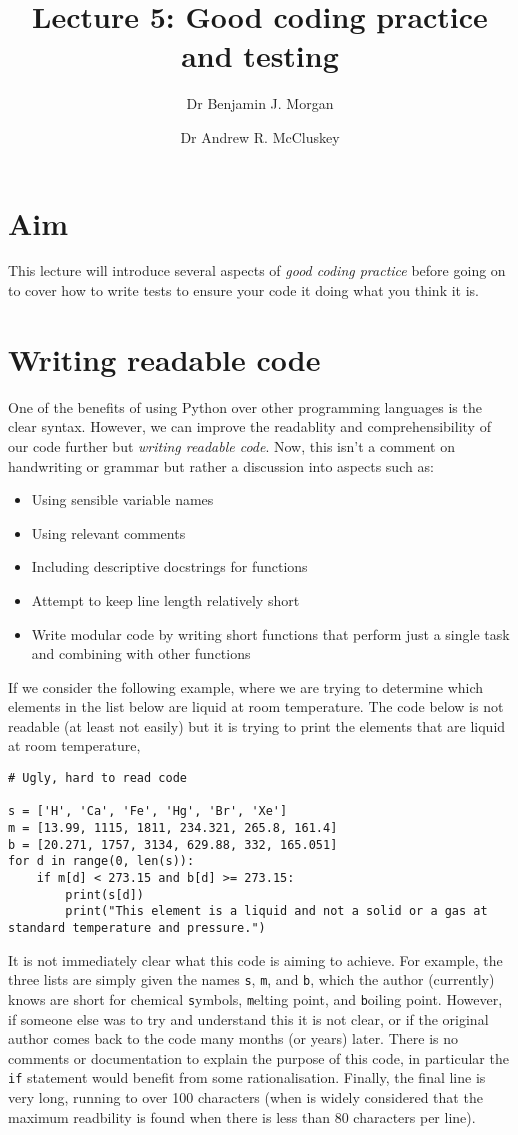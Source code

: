 \documentclass[a4paper]{article}
\title{Lecture 5: Good coding practice and testing}
\author[1]{Dr Benjamin J. Morgan}
\author[1,2]{Dr Andrew R. McCluskey}
\affil[1]{Department of Chemistry, University of Bath, email: b.j.morgan@bath.ac.uk}
\affil[2]{Diamond Light Source, email: andrew.mccluskey@diamond.ac.uk}
\begin{document}
\maketitle

\section*{Aim}
This lecture will introduce several aspects of \emph{good coding practice} before going on to cover how to write tests to ensure your code it doing what you think it is.

\section{Writing readable code}
One of the benefits of using Python over other programming languages is the clear syntax.
However, we can improve the readablity and comprehensibility of our code further but \emph{writing readable code}.
Now, this isn't a comment on handwriting or grammar but rather a discussion into aspects such as:
\begin{itemize}
  \item{Using sensible variable names}
  \item{Using relevant comments}
  \item{Including descriptive docstrings for functions}
  \item{Attempt to keep line length relatively short}
  \item{Write modular code by writing short functions that perform just a single task and combining with other functions}
\end{itemize}
If we consider the following example, where we are trying to determine which elements in the list below are liquid at room temperature.
The code below is not readable (at least not easily) but it is trying to print the elements that are liquid at room temperature,
\begin{lstlisting}
# Ugly, hard to read code

s = ['H', 'Ca', 'Fe', 'Hg', 'Br', 'Xe']
m = [13.99, 1115, 1811, 234.321, 265.8, 161.4]
b = [20.271, 1757, 3134, 629.88, 332, 165.051]
for d in range(0, len(s)):
    if m[d] < 273.15 and b[d] >= 273.15:
        print(s[d])
        print("This element is a liquid and not a solid or a gas at standard temperature and pressure.")
\end{lstlisting}
It is not immediately clear what this code is aiming to achieve.
For example, the three lists are simply given the names \texttt{s}, \texttt{m}, and \texttt{b}, which the author (currently) knows are short for chemical \texttt{s}ymbols, \texttt{m}elting point, and \texttt{b}oiling point.
However, if someone else was to try and understand this it is not clear, or if the original author comes back to the code many months (or years) later.
There is no comments or documentation to explain the purpose of this code, in particular the \texttt{if} statement would benefit from some rationalisation.
Finally, the final line is very long, running to over 100 characters (when is widely considered that the maximum readbility is found when there is less than 80 characters per line).
\end{document}
